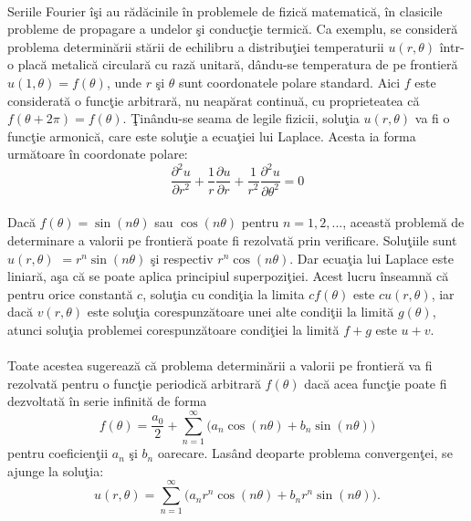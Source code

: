 \documentclass[a4paper,openany,12pt]{report}
\begin{document}
\paragraph*{}
Seriile Fourier \^ i\c si au r\u ad\u acinile \^ in problemele de fizic\u a matematic\u a, \^ in clasicile probleme de propagare a undelor \c si conduc\c tie termic\u a. Ca exemplu, se consider\u a problema determin\u arii st\u arii de echilibru a distribu\c tiei temperaturii $u(r, \theta)$ \^intr-o plac\u a metalic\u a circular\u a cu raz\u a unitar\u a, d\^ andu-se temperatura de pe frontier\u a $u(1, \theta)=f(\theta)$, unde $r$ \c si $\theta$ sunt coordonatele polare standard. Aici $f$ este considerat\u a o func\c tie arbitrar\u a, nu neap\u arat continu\u a, cu proprieteatea c\u a $f(\theta + 2\pi) = f(\theta)$. \c Tin\^ andu-se seama de legile fizicii, solu\c tia $u(r, \theta)$ va fi o func\c tie armonic\u a, care este solu\c tie a ecua\c tiei lui Laplace. Acesta ia forma urm\u atoare \^ in coordonate polare:
\begin{equation}
\frac{\partial^2 u}{\partial r^2} + \frac{1}{r}\frac{\partial u}{\partial r} + \frac{1}{r^2}\frac{\partial^2 u}{\partial \theta^2} = 0
\end {equation}
\paragraph*{}Dac\u a $f(\theta) = \sin(n\theta)$ sau $\cos(n\theta)$ pentru $n = 1, 2, ...$, aceast\u a problem\u a de determinare a valorii pe frontier\u a poate fi rezolvat\u a prin verificare. Solu\c tiile sunt $u(r, \theta)$ $= r^n \sin(n\theta)$ \c si respectiv $r^n \cos(n\theta)$. Dar ecua\c tia lui Laplace este liniar\u a, a\c sa c\u a se poate aplica principiul superpozi\c tiei. Acest lucru \^ inseamn\u a c\u a pentru orice constant\u a $c$, solu\c tia cu condi\c tia la limita $cf(\theta)$ este $cu(r, \theta)$, iar dac\u a $v(r, \theta)$ este solu\c tia corespunz\u atoare unei alte condi\c tii la limit\u a $g(\theta)$, atunci solu\c tia problemei corespunz\u atoare condi\c tiei la limit\u a $f + g$ este $u + v$.

 
\paragraph*{}Toate acestea sugereaz\u a c\u a problema determin\u arii a valorii pe frontier\u a va fi rezolvat\u a pentru o func\c tie periodic\u a arbitrar\u a $f(\theta)$ dac\u a acea func\c tie poate fi dezvoltat\u a \^ in serie infinit\u a de forma
\begin{equation}
f(\theta) = \frac{a_0}{2} + \sum_{n=1}^{\infty}{\Big(a_n \cos(n\theta) + b_n \sin(n\theta)\Big)}
\end{equation}
pentru coeficien\c tii $a_n$ \c si $b_n$ oarecare. Las\^ and deoparte problema convergen\c tei, se ajunge la solu\c tia:
\begin{equation}
u(r, \theta) = \sum_{n=1}^{\infty}{\Big(a_n r^n \cos(n\theta) + b_n r^n \sin(n\theta)\Big)}.
\end{equation}
\end{document}
